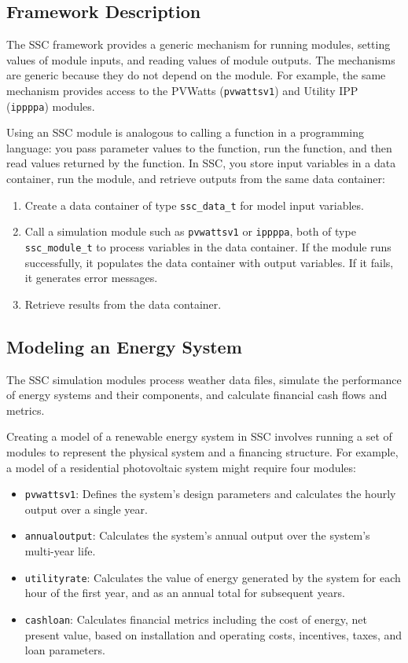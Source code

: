\documentclass{article}
\begin{document}
\subsection{Framework Description}

The SSC framework provides a generic mechanism for running modules, setting values of module inputs, and reading values of module outputs. The mechanisms are generic because they do not depend on the module. For example, the same mechanism provides access to the PVWatts (\texttt{pvwattsv1}) and Utility IPP (\texttt{ippppa}) modules.  

Using an SSC module is analogous to calling a function in a programming language: you pass parameter values to the function, run the function, and then read values returned by the function.  In SSC, you store input variables in a data container, run the module, and retrieve outputs from the same data container:

\begin{enumerate}
\item Create a data container of type \texttt{ssc\_data\_t} for model input variables.
\item Call a simulation module such as \texttt{pvwattsv1} or \texttt{ippppa}, both of type \texttt{ssc\_module\_t} to process variables in the data container. If the module runs successfully, it populates the data container with output variables. If it fails, it generates error messages.
\item Retrieve results from the data container.
\end{enumerate}

\subsection{Modeling an Energy System}
\label{sec_modeling_systems}

The SSC simulation modules process weather data files, simulate the performance of energy systems and their components, and calculate financial cash flows and metrics.

Creating a model of a renewable energy system in SSC involves running a set of modules to represent the physical system and a financing structure. For example, a model of a residential photovoltaic system might require four modules:

\begin{itemize}
\item \texttt{pvwattsv1}: Defines the system's design parameters and calculates the hourly output over a single year.
\item \texttt{annualoutput}: Calculates the system's annual output over the system's multi-year life.
\item \texttt{utilityrate}: Calculates the value of energy generated by the system for each hour of the first year, and as an annual total for subsequent years.
\item \texttt{cashloan}: Calculates financial metrics including the cost of energy, net present value, based on installation and operating costs, incentives, taxes, and loan parameters.
\end{itemize}
\end{document}
